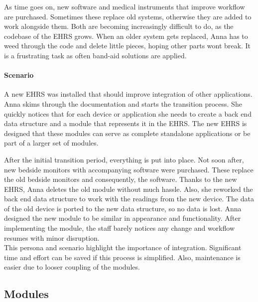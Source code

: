         As time goes on, new software and medical instruments that improve workflow are purchased. Sometimes these replace old systems, otherwise they are added to work alongside them. Both are becoming increasingly difficult to do, as the codebase of the EHRS grows. When an older system gets replaced, Anna has to weed through the code and delete little pieces, hoping other parts wont break. It is a frustrating task as often band-aid solutions are applied.

        \paragraph{Scenario} A new EHRS was installed that should improve integration of other applications. Anna skims through the documentation and starts the transition process. She quickly notices that for each device or application she needs to create a back end data structure and a module that represents it in the EHRS. The new EHRS is designed that these modules can serve as complete standalone applications or be part of a larger set of modules.

        After the initial transition period, everything is put into place. Not soon after, new bedside monitors with accompanying software were purchased. These replace the old bedside monitors and consequently, the software. Thanks to the new EHRS, Anna deletes the old module without much hassle. Also, she reworked the back end data structure to work with the readings from the new device. The data of the old device is ported to the new data structure, so no data is lost. Anna designed the new module to be similar in appearance and functionality. After implementing the module, the staff barely notices any change and workflow resumes with minor disruption.\\

        \noindent This persona and scenario highlight the importance of integration. Significant time and effort can be saved if this process is simplified. Also, maintenance is easier due to looser coupling of the modules.

    \subsection{Modules} \label{design_modules}
    
